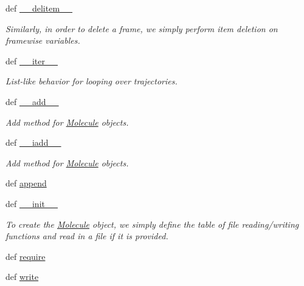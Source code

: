 \begin{DoxyCompactItemize}
def \hyperlink{classforcebalance_1_1molecule_1_1Molecule_ab4a7a79d738889528f3823b46244ea7d}{\-\_\-\-\_\-delitem\-\_\-\-\_\-}
\begin{DoxyCompactList}\small\item\em \-Similarly, in order to delete a frame, we simply perform item deletion on framewise variables. \end{DoxyCompactList}\item 
def \hyperlink{classforcebalance_1_1molecule_1_1Molecule_a40360a68b3f2f14406d3524e62f0c0a1}{\-\_\-\-\_\-iter\-\_\-\-\_\-}
\begin{DoxyCompactList}\small\item\em \-List-\/like behavior for looping over trajectories. \end{DoxyCompactList}\item 
def \hyperlink{classforcebalance_1_1molecule_1_1Molecule_a3e82ae8215555b543f1e5800b718c409}{\-\_\-\-\_\-add\-\_\-\-\_\-}
\begin{DoxyCompactList}\small\item\em \-Add method for \hyperlink{classforcebalance_1_1molecule_1_1Molecule}{\-Molecule} objects. \end{DoxyCompactList}\item 
def \hyperlink{classforcebalance_1_1molecule_1_1Molecule_ae1bcdf1cc78a6cc165de80bacc7b69c5}{\-\_\-\-\_\-iadd\-\_\-\-\_\-}
\begin{DoxyCompactList}\small\item\em \-Add method for \hyperlink{classforcebalance_1_1molecule_1_1Molecule}{\-Molecule} objects. \end{DoxyCompactList}\item 
def \hyperlink{classforcebalance_1_1molecule_1_1Molecule_a77417ff99b19f6d0b7c6f527e83fa7f1}{append}
\item 
def \hyperlink{classforcebalance_1_1molecule_1_1Molecule_a3f8233f4e9911d7af0f17ca66c16ff92}{\-\_\-\-\_\-init\-\_\-\-\_\-}
\begin{DoxyCompactList}\small\item\em \-To create the \hyperlink{classforcebalance_1_1molecule_1_1Molecule}{\-Molecule} object, we simply define the table of file reading/writing functions and read in a file if it is provided. \end{DoxyCompactList}\item 
def \hyperlink{classforcebalance_1_1molecule_1_1Molecule_a80851250d8e749bea882d5aa4bcfcdd1}{require}
\item 
def \hyperlink{classforcebalance_1_1molecule_1_1Molecule_a4ecfdf28aacff9c081dd50cd4ac84f89}{write}

\end{DoxyCompactItemize}

